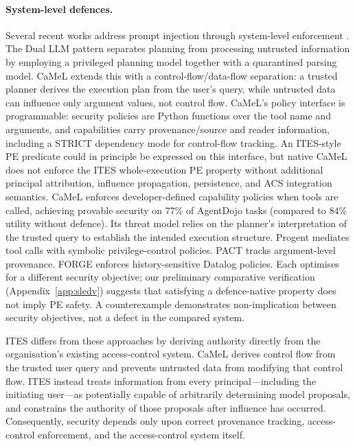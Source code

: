 \documentclass{article}
\begin{document}
\paragraph{System-level defences.}
Several recent works address prompt injection through system-level enforcement
\citep{debenedetti2025defeatingpromptinjectionsdesign,wu2024systemleveldefenseindirectprompt,beurerkellner2025designpatternssecuringllm}.
The Dual LLM pattern separates planning from processing untrusted information
by employing a privileged planning model together with a quarantined parsing
model. CaMeL \citep{debenedetti2025defeatingpromptinjectionsdesign} extends
this with a control-flow/data-flow separation: a trusted planner derives the
execution plan from the user's query, while untrusted data can influence only
argument values, not control flow. CaMeL's policy interface is programmable:
security policies are Python functions over the tool name and arguments, and
capabilities carry provenance/source and reader information, including a
STRICT dependency mode for control-flow tracking. An ITES-style PE predicate
could in principle be expressed on this interface, but native CaMeL does not
enforce the ITES whole-execution PE property without additional principal
attribution, influence propagation, persistence, and ACS integration
semantics. CaMeL enforces developer-defined capability
policies when tools are called, achieving provable security on 77\% of
AgentDojo tasks (compared to 84\% utility without defence). Its threat model
relies on the planner's interpretation of the trusted query to establish the
intended execution structure. Progent
\citep{progent2025} mediates tool calls with symbolic privilege-control
policies. PACT \citep{pact2026} tracks argument-level provenance. FORGE
\citep{forge2026} enforces history-sensitive Datalog policies. Each optimises
for a different security objective; our preliminary comparative verification
(Appendix~\ref{app:sledv}) suggests that satisfying a defence-native
property does not imply PE safety. A counterexample demonstrates
non-implication between security objectives, not a defect in the compared
system.

ITES differs from these approaches by deriving authority directly from the
organisation's existing access-control system. CaMeL derives control flow from
the trusted user query and prevents untrusted data from modifying that control
flow. ITES instead treats information from every principal---including the
initiating user---as potentially capable of arbitrarily determining model
proposals, and constrains the authority of those proposals after influence has
occurred. Consequently, security depends only upon correct provenance tracking,
access-control enforcement, and the access-control system itself.
\end{document}
